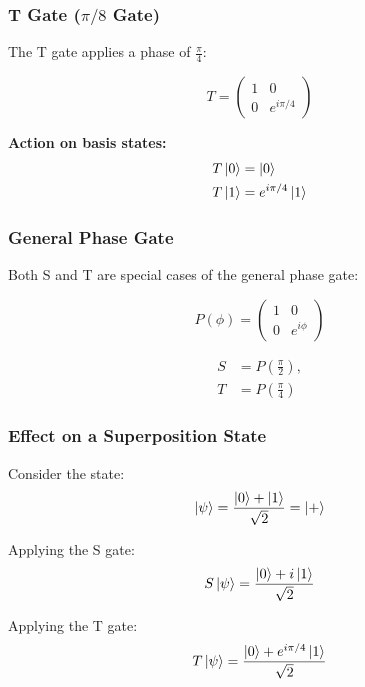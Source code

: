 \subsubsection{T Gate ($\pi/8$ Gate)}

The T gate applies a phase of $\frac{\pi}{4}$:

\begin{equation}
T =
\begin{pmatrix}
1 & 0 \\
0 & e^{i\pi/4}
\end{pmatrix}
\end{equation}

\textbf{Action on basis states:}
\begin{align}
T\ket{0} &= \ket{0} \\
T\ket{1} &= e^{i\pi/4}\ket{1}
\end{align}

\subsubsection{General Phase Gate}

Both S and T are special cases of the general phase gate:

\begin{equation}
P(\phi) =
\begin{pmatrix}
1 & 0 \\
0 & e^{i\phi}
\end{pmatrix}
\end{equation}

\begin{align}
S &= P\left(\frac{\pi}{2}\right), \\
T &= P\left(\frac{\pi}{4}\right)
\end{align}

\subsubsection{Effect on a Superposition State}

Consider the state:
\begin{equation}
\ket{\psi} = \frac{\ket{0} + \ket{1}}{\sqrt{2}} = \ket{+}
\end{equation}

Applying the S gate:
\begin{equation}
S\ket{\psi} = \frac{\ket{0} + i\ket{1}}{\sqrt{2}}
\end{equation}

Applying the T gate:
\begin{equation}
T\ket{\psi} = \frac{\ket{0} + e^{i\pi/4}\ket{1}}{\sqrt{2}}
\end{equation}

